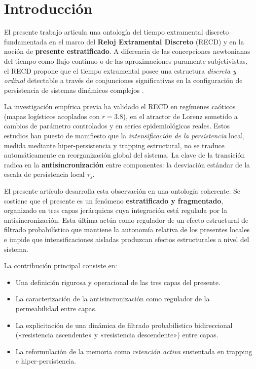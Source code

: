\section{Introducción}

El presente trabajo articula una ontología del tiempo extramental discreto fundamentada en el marco del \textbf{Reloj Extramental Discreto} (RECD) y en la noción de \textbf{presente estratificado}. A diferencia de las concepciones newtonianas del tiempo como flujo continuo o de las aproximaciones puramente subjetivistas, el RECD propone que el tiempo extramental posee una estructura \textit{discreta y ordinal} detectable a través de conjunciones significativas en la configuración de persistencia de sistemas dinámicos complejos \citep{padilla_bayesian_accumulator_2026,padilla_sintesis_magna_2026}.

La investigación empírica previa ha validado el RECD en regímenes caóticos (mapas logísticos acoplados con $r=3.8$), en el atractor de Lorenz sometido a cambios de parámetro controlados y en series epidemiológicas reales. Estos estudios han puesto de manifiesto que la \textit{intensificación de la persistencia} local, medida mediante hiper-persistencia y trapping estructural, no se traduce automáticamente en reorganización global del sistema. La clave de la transición radica en la \textbf{antisincronización} entre componentes: la desviación estándar de la escala de persistencia local $\tau_s$.

El presente artículo desarrolla esta observación en una ontología coherente. Se sostiene que el presente es un fenómeno \textbf{estratificado y fragmentado}, organizado en tres capas jerárquicas cuya integración está regulada por la antisincronización. Esta última actúa como regulador de un efecto estructural de filtrado probabilístico que mantiene la autonomía relativa de los presentes locales e impide que intensificaciones aisladas produzcan efectos estructurales a nivel del sistema.

La contribución principal consiste en:
\begin{itemize}
    \item Una definición rigurosa y operacional de las tres capas del presente.
    \item La caracterización de la antisincronización como regulador de la permeabilidad entre capas.
    \item La explicitación de una dinámica de filtrado probabilístico bidireccional («resistencia ascendente» y «resistencia descendente») entre capas.
    \item La reformulación de la memoria como \textit{retención activa} sustentada en trapping e hiper-persistencia.
\end{itemize}

